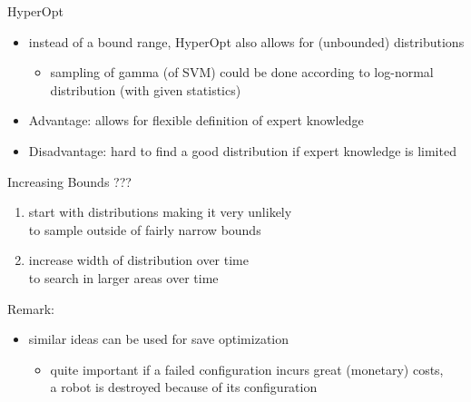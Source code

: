 \begin{frame}[c]{HyperOpt}

\begin{itemize}
  \item instead of a bound range, HyperOpt also allows for (unbounded) distributions
  \begin{itemize}
    \item sampling of gamma (of SVM) could be done according to log-normal distribution (with given statistics) 
  \end{itemize}
  \item Advantage: allows for flexible definition of expert knowledge
  \item Disadvantage: hard to find a good distribution if expert knowledge is limited
\end{itemize}


\end{frame}
\begin{frame}[c]{Increasing Bounds {???}}

\begin{enumerate}
  \item start with distributions making it very unlikely\\ to sample outside of fairly narrow bounds
  \item increase width of distribution over time\\ to search in larger areas over time
\end{enumerate}

\bigskip
\pause

Remark:
\begin{itemize}
  \item similar ideas can be used for save optimization
  \begin{itemize}
    \item quite important if a failed configuration incurs great (monetary) costs, \\
          a robot is destroyed because of its configuration
  \end{itemize}
\end{itemize}

\end{frame}
